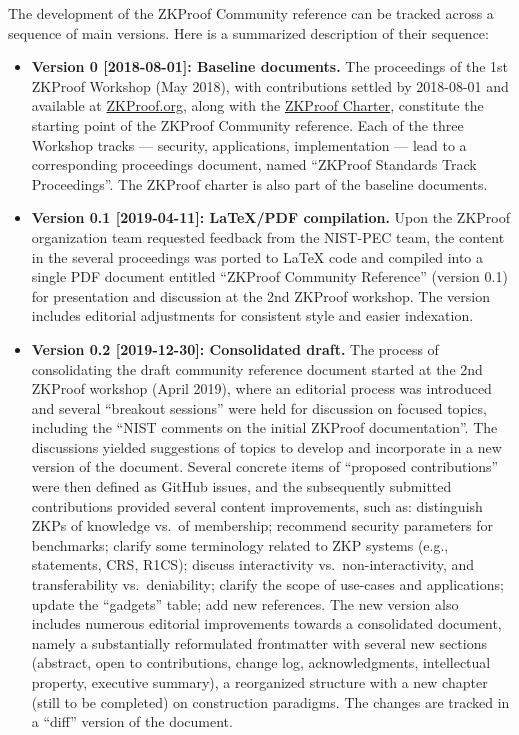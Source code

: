 \label{sec:prelim:change-log}


The development of the ZKProof Community reference can be tracked across a sequence of main versions.
Here is a summarized description of their sequence:

\begin{itemize}\setlength{\itemsep}{1em}

\item \textbf{Version 0 [2018-08-01]: Baseline documents.}
	The proceedings of the 1st ZKProof Workshop (May 2018), 
with contributions settled by 2018-08-01 and available 
at \href{https://zkproof.org/documents}{ZKProof.org},
along with the \hyperref[sec:prelim:charter]{ZKProof Charter}, 
constitute the starting point of the ZKProof Community reference.
	Each of the three Workshop tracks --- security, applications, implementation --- 
lead to a corresponding proceedings document, 
named ``ZKProof Standards  Track Proceedings''.
	The ZKProof charter is also part of the baseline documents.


\item \textbf{Version 0.1 [2019-04-11]: LaTeX/PDF compilation.}
	Upon the ZKProof organization team requested feedback from the NIST-PEC team, the content in the 
several proceedings was ported to LaTeX code and compiled into a single PDF document entitled 
``ZKProof Community Reference'' (version 0.1) for presentation and discussion at the 2nd ZKProof workshop.
	The version includes editorial adjustments for consistent style and easier indexation. 


\item \textbf{Version 0.2 [2019-12-30]: Consolidated draft.}
	The process of consolidating the draft community reference document started at the 
2nd ZKProof workshop (April 2019), where an editorial process was introduced and 
several ``breakout sessions'' were held for discussion on focused topics, including
the ``NIST comments on the initial ZKProof documentation''.
	The discussions yielded suggestions of topics to develop and incorporate in a new version of the document.
	Several concrete items of ``proposed contributions'' were then defined as GitHub issues,
and the subsequently submitted contributions provided several content improvements, such as:
	distinguish ZKPs of knowledge vs.\ of membership;
	recommend security parameters for benchmarks;
	clarify some terminology related to ZKP systems (e.g., statements, CRS, R1CS);
	discuss interactivity vs.\ non-interactivity, and transferability vs.\ deniability;
	clarify the scope of use-cases and applications; 
	update the ``gadgets'' table; add new references.
	The new version also includes numerous editorial improvements towards a consolidated document, 
namely a substantially reformulated frontmatter with several new sections
(abstract, open to contributions, change log, acknowledgments, intellectual property, executive summary),
a reorganized structure with a new chapter (still to be completed) on construction paradigms.
	The changes are tracked in a ``diff'' version of the document.
\end{itemize}


